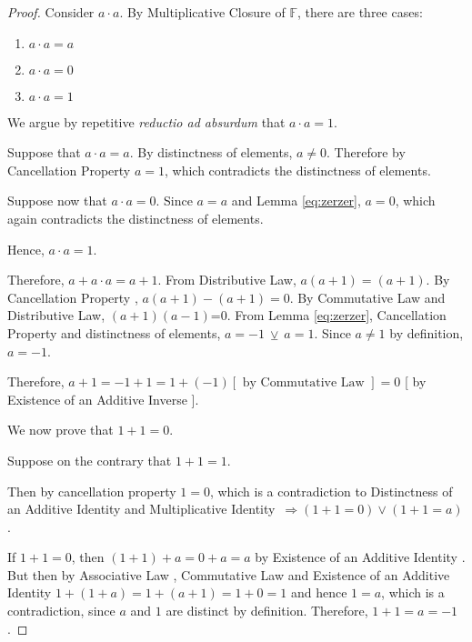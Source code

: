 \documentclass[12pt]{article}
\def\F{\mathbb{F}}
\def\mclo{Multiplicative Closure of }
\def\dist{Distributive Law}
\def\ainv{Existence of an Additive Inverse }
\def\comm{Commutative Law }
\def\assoc{Associative Law }
\def\aid{Existence of an Additive Identity }
\def\canc{Cancellation Property }
\def\die{Distinctness of an Additive Identity and Multiplicative Identity}
\def\ra{\Rightarrow}
\def\v{\vspace{0.1in}}
\theoremstyle{definition}
\theoremstyle{remark}
\begin{document}
\begin{proof}
  Consider $a\cdot a$. By \mclo $\F$, there are three cases:

  \begin{enumerate}
  \item $a\cdot a=a$
  \item $a\cdot a=0$
  \item $a\cdot a=1$
  \end{enumerate}
  We argue by repetitive \textit{reductio ad absurdum} that $a\cdot a=1$.\\\v

  Suppose that $a\cdot a=a$. By distinctness of elements, $a\neq
  0$. Therefore by \canc $a=1$, which contradicts the distinctness of
  elements.\\\v

  Suppose now that $a\cdot a=0$. Since $a=a$ and Lemma
  \ref{eq:zerzer}, $a=0$, which again contradicts the distinctness of
  elements.\\\v

  Hence, $a\cdot a=1$.\\\v

  Therefore, $a+a\cdot a=a+1$. From \dist, $a(a+1)=(a+1)$. By
  \canc, $a(a+1)-(a+1)=0$. By \comm and \dist, $(a+1)(a-1)$=0. From Lemma \ref{eq:zerzer},
  \canc and distinctness of elements, $a=-1\ \veebar\ a=1$. Since
  $a\neq 1$ by definition, $a=-1$.\\\v

  Therefore, $a+1=-1+1=1+(-1) [\text{ by \comm}]=0$ [ by \ainv].\\\v

  We now prove that $1+1=0$.\\\v

  Suppose on the contrary that $1+1=1$.\\\v

  Then by cancellation property $1=0$, which is a
  contradiction to \die\ $\ra (1+1=0) \vee (1+1=a)$.\\ \v

  If $1+1 = 0 $, then $(1+1)+ a = 0 + a = a$ by \aid. But then by
  \assoc, \comm and \aid $1+(1+a)=1+(a+1)=1+0=1$ and hence $1=a$,
  which is a contradiction, since $a$ and $1$ are distinct by
  definition. Therefore, $1+1=a=-1$.

\end{proof}
\end{document}
